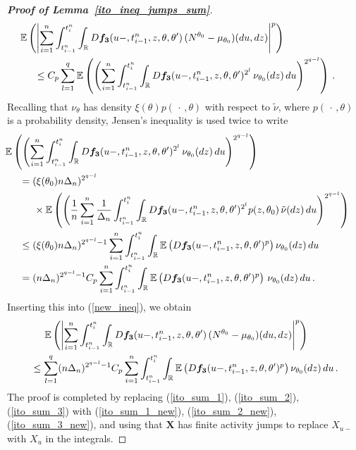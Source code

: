 \documentclass[11pt,a4paper]{article}
\newcommand{\thetan}{{\theta_0}}
\newcommand{\tminus}{{t_{i-1}^n}}
\newcommand{\tplus}{{t_i^n}}
\newcommand{\EE}{{\mathbb E}}
\newcommand{\RR}{{\mathbb R}}
\newcommand{\X}{{\mathbf X}}
\numberwithin{equation}{section}
\numberwithin{theorem}{section}
\begin{document}
\begin{proof}[\textbf{Proof of Lemma~\ref{ito_ineq_jumps_sum}}]
\begin{align}
  \begin{split}
&\hspace{-5mm} \EE\left( \left|\sum_{i=1}^n \int_\tminus^\tplus \int_\RR
  D\bm{f_3}(u-,\tminus,z, \theta, \theta')\,
  (N^\thetan-\mu_\thetan)(du,dz)\right|^p\right)\\
&\leq C_p \sum_{l=1}^q \EE\left(\left( \sum_{i=1}^n \int_\tminus^\tplus \int_\RR
D\bm{f_3}(u-,\tminus,z, \theta, \theta')^{2^l}\,
 \nu_\thetan(dz)\,du\right)^{2^{q-l}}\right)\,.
\end{split}
\label{new_ineq}
\end{align}
%
Recalling that $\nu_\theta$ has density $\xi(\theta)p(\,\cdot\,,\theta)$ with
respect to $\tilde{\nu}$, where $p(\,\cdot\,,\theta)$ is a probability
density, Jensen's inequality is used twice to write
\begin{align*}
&\hspace{-5mm} \EE\left(
  \left(\sum_{i=1}^n \int_\tminus^\tplus \int_\RR  D\bm{f_3}(u-,\tminus,z, \theta,\theta')^{2^l} \, \nu_\thetan(dz)\,du\right)^{2^{q-l}}\right)\nonumber\\
&= (\xi(\thetan)n\Delta_n)^{2^{q-l}} \\
&\hspace{5mm} \times \EE\left(
  \left(\frac{1}{n} \sum_{i=1}^n \frac{1}{\Delta_n}\int_\tminus^\tplus \int_\RR 
    D\bm{f_3}(u-,\tminus,z, \theta,\theta')^{2^l} p(z,\thetan)\,
    \tilde{\nu}(dz)\, du\right)^{2^{q-l}}\right) \nonumber\\
&\leq  (\xi(\thetan)n\Delta_n)^{2^{q-l}-1}
  \sum_{i=1}^n \int_\tminus^\tplus \int_\RR  \EE\left(
    D\bm{f_3}(u-,\tminus,z, \theta,\theta')^{p}\right)
  \nu_\thetan(dz)\, du\nonumber\\
&= (n\Delta_n)^{2^{q-l}-1}C_p
  \sum_{i=1}^n \int_\tminus^\tplus \int_\RR  \EE\left(
    D\bm{f_3}(u-,\tminus,z, \theta,\theta')^{p}\right)
  \,\nu_\thetan(dz)\, du\,.
\end{align*}
%
Inserting this into (\ref{new_ineq}), we obtain
\begin{align}
&\hspace{5mm} \EE\left( \left|\sum_{i=1}^n \int_\tminus^\tplus \int_\RR
 D\bm{f_3}(u-,\tminus,z, \theta, \theta')\,
  (N^\thetan-\mu_\thetan)(du,dz)\right|^p\right)\nonumber\\
&\leq \sum_{l=1}^q (n\Delta_n)^{2^{q-l}-1}C_p 
  \sum_{i=1}^n \int_\tminus^\tplus \int_\RR  \EE\left(
D\bm{f_3}(u-,\tminus,z, \theta,\theta')^{p}\right)
  \nu_\thetan(dz)\, du\,.
\label{ito_sum_3_new}
\end{align}
%
The proof is completed by replacing (\ref{ito_sum_1}), (\ref{ito_sum_2}), (\ref{ito_sum_3}) with (\ref{ito_sum_1_new}), (\ref{ito_sum_2_new}), 
(\ref{ito_sum_3_new}), and using that $\X$ has finite
activity jumps to replace $X_{u-}$ with $X_u$ in the integrals.
\end{proof}
\end{document}
